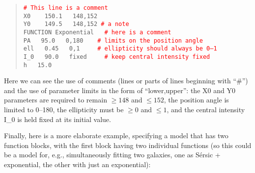 \documentclass[10pt]{article}
\newcommand{\red}{\textcolor{red}}
\begin{document}
\begin{quote}
  \texttt{\red{\# This line is a comment}}\\
  
  \texttt{X0 ~~   150.1 ~  148,152}\\
  \texttt{Y0 ~~   149.5 ~  148,152         \red{\# a note}}\\
  \texttt{FUNCTION   Exponential  ~ \red{\# here is a comment}}\\
  \texttt{PA  ~  95.0  ~ 0,180   ~~   \red{\# limits on the position angle}}\\
  \texttt{ell  ~  0.45 ~ 0,1     ~~~ \red{\# ellipticity should always be 0--1}}\\
  \texttt{I\_0 ~  90.0 ~  fixed ~~~ \red{\# keep central intensity fixed}}\\
  \texttt{h    ~ 15.0}\\
\end{quote}

Here we can see the use of comments (lines or parts of lines beginning with
``\#'') and the use of parameter limits in the form of ``lower,upper'': the X0 and Y0 parameters are
required to remain $\geq 148$ and $\leq 152$, the position angle is limited
to 0--180, the ellipticity must be $\geq 0$ and $\leq 1$, and the central
intensity I\_0 is held fixed at its initial value.

Finally, here is a more elaborate example, specifying a model that has
two function blocks, with the first block having two individual
functions (so this could be a model for, e.g., simultaneously fitting
two galaxies, one as S\'ersic + exponential, the other with just an
exponential):
\end{document}
